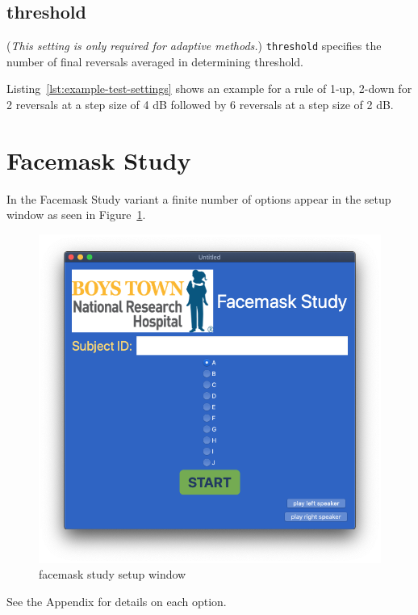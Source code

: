 \documentclass[11pt,pdftex,letterpaper]{article}
\begin{document}
\subsection{threshold}
(\textit{This setting is only required for adaptive methods.}) \texttt{threshold} specifies the number of final reversals averaged in determining threshold.

\vspace{\baselineskip}
Listing~\ref{lst:example-test-settings} shows an example for a rule of 1-up, 2-down for 2 reversals at a step size of 4 dB followed by 6 reversals at a step size of 2 dB.

\section{Facemask Study}
In the Facemask Study variant a finite number of options appear in the setup window as seen in Figure~\ref{fig:facemask-study}.
\begin{figure}
	\centering
	\includegraphics[width = 0.9\linewidth]{facemask-study.png}
	\caption{facemask study setup window}
	\label{fig:facemask-study}
\end{figure}
See the Appendix for details on each option.
\end{document}
